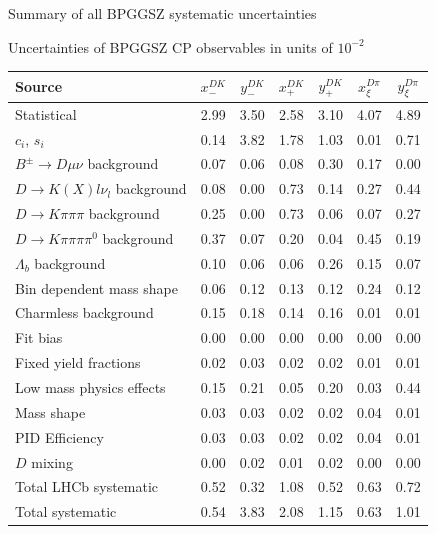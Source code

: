 \documentclass{beamer}
\begin{document}
\begin{frame}{Summary of all BPGGSZ systematic uncertainties}
  \begin{center}
    Uncertainties of BPGGSZ CP observables in units of $10^{-2}$
  \end{center}
  \scriptsize
  \vspace{0.02cm}
  \begin{center}
    \begin{tabular}{lcccccc} 
      \hline
      Source & $x_-^{DK}$ & $y_-^{DK}$ & $x_+^{DK}$ & $y_+^{DK}$ & $x_\xi^{D\pi}$ & $y_\xi^{D\pi}$ \\
      \hline
      Statistical                                   & 2.99  & 3.50  & 2.58  & 3.10  & 4.07  & 4.89  \\
      \hline
      $c_i$, $s_i$                                  & 0.14  & 3.82  & 1.78  & 1.03  & 0.01  & 0.71  \\
      \hline
      $B^\pm\to D\mu\nu$   background               & 0.07  & 0.06  & 0.08  & 0.30  & 0.17  & 0.00  \\
      $D\to K(X)l\nu_l$ background                  & 0.08  & 0.00  & 0.73  & 0.14  & 0.27  & 0.44  \\
      $D\to K\pi\pi\pi$ background                  & 0.25  & 0.00  & 0.73  & 0.06  & 0.07  & 0.27  \\
      $D\to K\pi\pi\pi\pi^0$ background             & 0.37  & 0.07  & 0.20  & 0.04  & 0.45  & 0.19  \\
      $\Lambda_b$ background                        & 0.10  & 0.06  & 0.06  & 0.26  & 0.15  & 0.07  \\
      Bin dependent mass shape                      & 0.06  & 0.12  & 0.13  & 0.12  & 0.24  & 0.12  \\
      Charmless background                          & 0.15  & 0.18  & 0.14  & 0.16  & 0.01  & 0.01  \\
      Fit bias                                      & 0.00  & 0.00  & 0.00  & 0.00  & 0.00  & 0.00  \\
      Fixed yield fractions                         & 0.02  & 0.03  & 0.02  & 0.02  & 0.01  & 0.01  \\
      Low mass physics effects                      & 0.15  & 0.21  & 0.05  & 0.20  & 0.03  & 0.44  \\
      Mass shape                                    & 0.03  & 0.03  & 0.02  & 0.02  & 0.04  & 0.01  \\
      PID Efficiency                                & 0.03  & 0.03  & 0.02  & 0.02  & 0.04  & 0.01  \\
      $D$ mixing                                    & 0.00  & 0.02  & 0.01  & 0.02  & 0.00  & 0.00  \\
      \hline
      Total LHCb systematic                         & 0.52  & 0.32  & 1.08  & 0.52  & 0.63  & 0.72  \\
      \hline
      Total systematic                              & 0.54  & 3.83  & 2.08  & 1.15  & 0.63  & 1.01  \\
      \hline
    \end{tabular}
  \end{center}
\end{frame}
\end{document}

